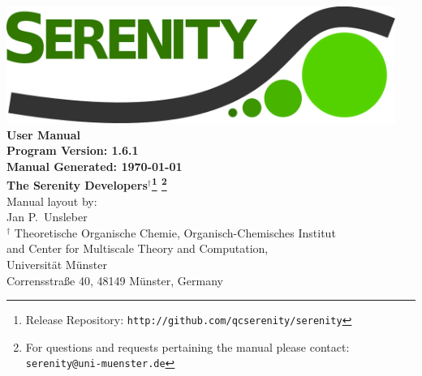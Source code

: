 \documentclass[bibliography=totocnumbered,a4paper,10pt,oneside]{scrbook}
\begin{document}
\thispagestyle{empty}
\begin{center}
\vspace*{1cm}
\includegraphics[width=0.95\textwidth]{./figs/SerenityLogo.png}\\
\vspace{2cm}
{\LARGE\textbf{
User Manual
}}\\
\vspace{1cm}
{\large\textbf{
Program Version: 1.6.1\\
Manual Generated: \today
}}\\
\vspace{2cm}
{\large\textbf{
The Serenity Developers$^{\dagger}$\footnote{Release Repository: \texttt{http://github.com/qcserenity/serenity}}
\footnote{For questions and requests pertaining the manual please contact:\\ \texttt{serenity@uni-muenster.de}}
}}\\
\vspace{2cm}
{\large Manual layout by: \\
Jan P.\ Unsleber
}
\\[2ex]

$^{\dagger}$ Theoretische Organische Chemie,
Organisch-Chemisches Institut \\
and Center for Multiscale Theory and Computation,\\
Universit\"at M\"unster\\
Corrensstra{\ss}e 40, 48149 M\"unster, Germany\\[2ex]

\vfill
\end{center}
\newpage
{}
\setcounter{page}{1}
\tableofcontents

\newpage
{}
\setcounter{page}{1}





\end{document}
